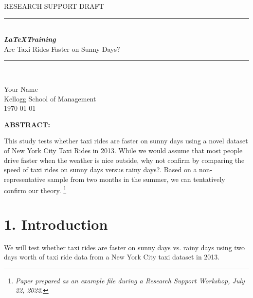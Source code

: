 \documentclass[11pt]{article}
\newcommand{\HRule}{\rule{\linewidth}{0.5mm}}
\begin{document}
 

\begin{titlepage}
\begin{center}

\textsc{\LARGE RESEARCH SUPPORT DRAFT}\\[0.5cm] 

\HRule \\[0.4cm]
{ \huge \bfseries \emph{ \LaTeX Training}  \\[0.4cm] }
{ \Large Are Taxi Rides Faster on Sunny Days?}
\HRule \\[1.5cm]

\begin{minipage}{0.75\textwidth}
\begin{center} 
\LARGE {Your Name}\\
\LARGE Kellogg School of Management\\
\LARGE \today
\end{center}
\end{minipage}

\vfill

{\bf ABSTRACT:}
\begin{flushleft}
This study tests whether taxi rides are faster on sunny days using a novel dataset of New York City Taxi Rides in 2013. While we would assume that most people drive faster when the weather is nice outside, why not confirm by comparing the speed of taxi rides on sunny days versus rainy days?.  Based on a non-representative sample from two months in the summer, we can tentatively confirm our theory. \footnote{\emph{Paper prepared as an example file during a Research Support Workshop, July 22, 2022}.}  

\end{flushleft}

\vfill


\end{center}
\end{titlepage}



\newpage

\section*{1. Introduction}

We will test whether taxi rides are faster on sunny days vs. rainy days using two days worth of taxi ride data from a New York City taxi dataset in 2013. 
\end{document}
